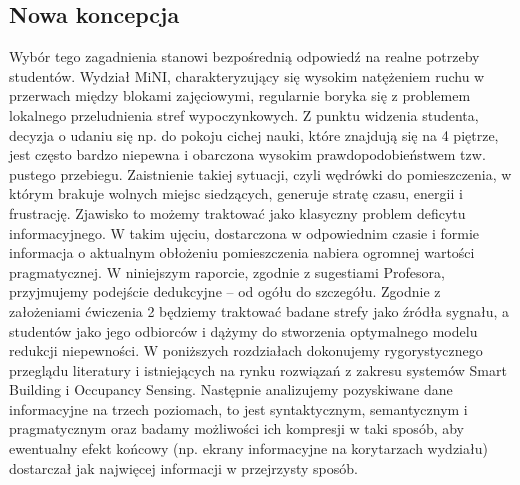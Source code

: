 \documentclass[14pt,a4paper]{extarticle}
\begin{document}
\subsection{Nowa koncepcja}
Wybór tego zagadnienia stanowi bezpośrednią odpowiedź na realne potrzeby studentów. Wydział MiNI, charakteryzujący się wysokim natężeniem ruchu w przerwach między blokami zajęciowymi, regularnie boryka się z problemem lokalnego przeludnienia stref wypoczynkowych. Z punktu widzenia studenta, decyzja o udaniu się np. do pokoju cichej nauki, które znajdują się na 4 piętrze, jest często bardzo niepewna i obarczona wysokim prawdopodobieństwem tzw. pustego przebiegu. Zaistnienie takiej sytuacji, czyli wędrówki do pomieszczenia, w którym brakuje wolnych miejsc siedzących, generuje stratę czasu, energii i frustrację. Zjawisko to możemy traktować jako klasyczny problem deficytu informacyjnego. W takim ujęciu, dostarczona w odpowiednim czasie i formie informacja o aktualnym obłożeniu pomieszczenia nabiera ogromnej wartości pragmatycznej. W niniejszym raporcie, zgodnie z sugestiami Profesora, przyjmujemy podejście dedukcyjne -- od ogółu do szczegółu. Zgodnie z założeniami ćwiczenia 2 będziemy traktować badane strefy jako źródła sygnału, a studentów jako jego odbiorców i dążymy do stworzenia optymalnego modelu redukcji niepewności. W poniższych rozdziałach dokonujemy rygorystycznego przeglądu literatury i istniejących na rynku rozwiązań z zakresu systemów Smart Building i Occupancy Sensing. Następnie analizujemy pozyskiwane dane informacyjne na trzech poziomach, to jest syntaktycznym, semantycznym i pragmatycznym oraz badamy możliwości ich kompresji w taki sposób, aby ewentualny efekt końcowy (np. ekrany informacyjne na korytarzach wydziału) dostarczał jak najwięcej informacji w przejrzysty sposób.
\end{document}
